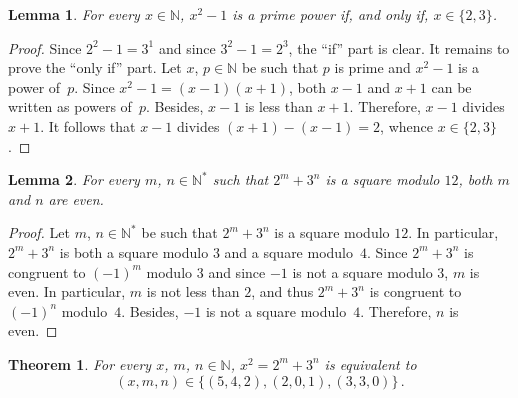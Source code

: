 \documentclass[12pt]{article}
\newcommand{\bZ}{\mathbb{Z}}
\newcommand{\bN}{\mathbb{N}} %
\newcommand{\bNast}{\bN^*}
\newtheorem{theorem}{Theorem}
\newtheorem{lemma}{Lemma}
\theoremstyle{definition}
\begin{document}
    
  
     \begin{lemma} \label{lem:x2=q+1}
       For every $x \in \bN$, $x^2 - 1$ is a prime power if, and only if, $x \in \{ 2, 3 \}$. 
     \end{lemma}

     \begin{proof}
       Since  $2^2 - 1 = 3^1$ and since $3^2 - 1 = 2^3$, the ``if'' part is clear.
       It remains to prove the ``only if'' part.
       Let $x$, $p \in \bN$ be such that $p$ is prime and $x^2 - 1$ is a power of~$p$.
       Since  $x^2 - 1 = (x - 1)(x + 1)$, 
       both $x - 1$ and $x + 1$ can be written as powers of~$p$.
       Besides, $x - 1$ is less than $x + 1$.
       Therefore, $x - 1$ divides $x + 1$.
       It follows that $x - 1$ divides $(x + 1) - (x - 1) = 2$,
       whence $x \in \{ 2, 3 \}$.
    \end{proof} 
    

   

   
   \begin{lemma} \label{lem:2m+3n-square-mod-12}
     For every $m$, $n \in \bNast$ such that $2^m + 3^n$ is a square modulo $12$,
     both $m$ and $n$ are even.
   \end{lemma}

   \begin{proof}
     Let $m$, $n \in \bNast$ be such that $2^m + 3^n$ is a square modulo $12$.
     In particular, $2^m + 3^n$ is both a square modulo $3$ and a square modulo~$4$.
     Since $2^m + 3^n$ is congruent to ${(- 1)}^m$ modulo $3$ and since $- 1$ is not a square modulo $3$,
     $m$ is even.
     In particular, $m$ is not less than $2$, and thus $2^m + 3^n$ is congruent to ${(- 1)}^n$ modulo~$4$.
     Besides, $- 1$ is not a square modulo~$4$.
     Therefore, $n$ is even.
   \end{proof}

   \begin{theorem}
     For every $x$, $m$, $n \in \bN$,
     $x^2 = 2^m + 3^n$ is equivalent to
     $$
     (x, m, n) \in \{  (5, 4, 2), (2, 0, 1), (3, 3, 0) \} \, .
     $$
   \end{theorem}
   
\end{document}
